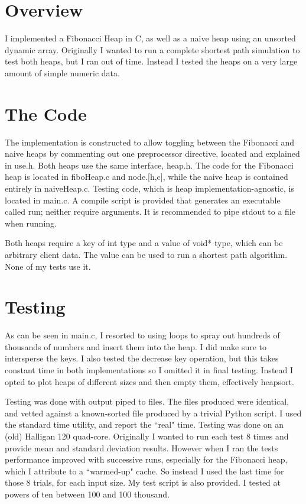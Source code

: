 \documentclass{article}
\begin{document}
\section{Overview}

I implemented a Fibonacci Heap in C, as well as a naive heap using an unsorted
dynamic array. Originally I wanted to run a complete shortest path simulation to
test both heaps, but I ran out of time. Instead I tested the heaps on a very
large amount of simple numeric data.

\section{The Code} The implementation is constructed to allow toggling between
the Fibonacci and naive heaps by commenting out one preprocessor directive,
located and explained in use.h. Both heaps use the same interface, heap.h. The
code for the Fibonacci heap is located in fiboHeap.c and node.[h,c], while the
naive heap is contained entirely in naiveHeap.c. Testing code, which is heap
implementation-agnostic, is located in main.c. A compile script is provided that
generates an executable called run; neither require arguments. It is recommended
to pipe stdout to a file when running.

Both heaps require a key of int type and a value of void* type, which can be
arbitrary client data. The value can be used to run a shortest path algorithm.
None of my tests use it.

\section{Testing}
As can be seen in main.c, I resorted to using loops to spray out hundreds of
thousands of numbers and insert them into the heap. I did make sure to
intersperse the keys. I also tested the decrease key operation, but this takes
constant time in both implementations so I omitted it in final testing. Instead
I opted to plot heaps of different sizes and then empty them, effectively
heapsort.

Testing was done with output piped to files. The files produced were identical,
and vetted against a known-sorted file produced by a trivial Python script. I
used the standard time utility, and report the ``real" time. Testing was done on
an (old) Halligan 120 quad-core.  Originally I wanted to run each test 8 times
and provide mean and standard deviation results. However when I ran the tests
performance improved with successive runs, especially for the Fibonacci heap,
which I attribute to a ``warmed-up" cache. So instead I used the last time for
those 8 trials, for each input size. My test script is also provided. I tested
at powers of ten between 100 and 100 thousand.
\end{document}
